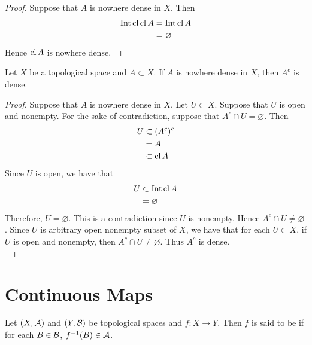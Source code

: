 \documentclass{book}
\begin{document}
	\begin{proof}
		Suppose that $A$ is nowhere dense in $X$. Then 
		\begin{align*}
			\operatorname{Int} \operatorname{cl} \operatorname{cl} A
			& = \operatorname{Int} \operatorname{cl} A \\
			& = \varnothing
		\end{align*}
		Hence $\operatorname{cl} A$ is nowhere dense.
	\end{proof}
	

	\begin{ex}  
		Let $X$ be a topological space and $A \subset X$. If $A$ is nowhere dense in $X$, then $A^c$ is dense.
	\end{ex}
	
	\begin{proof}
		Suppose that $A$ is nowhere dense in $X$. Let $U \subset X$. Suppose that $U$ is open and nonempty. For the sake of contradiction, suppose that  $A^c \cap U = \varnothing$. Then 
		\begin{align*}
			U 
			& \subset (A^c)^c \\
			& = A \\
			& \subset \operatorname{cl} A
		\end{align*}
		Since $U$ is open, we have that  
		\begin{align*}
			U 
			& \subset \operatorname{Int} \operatorname{cl} A \\
			& = \varnothing 
		\end{align*}
		Therefore, $U = \varnothing$. This is a contradiction since $U$ is nonempty. Hence $A^c \cap U \neq \varnothing$. Since $U$ is arbitrary open nonempty subset of $X$, we have that for each $U \subset X$, if $U$ is open and nonempty, then $A^c \cap U \neq \varnothing$. Thus $A^c$ is dense.  \\
	\end{proof}
	
	
	
	
	
	
	
	
	
	
	
	
	
	
	
	
	
	
	
	
	
	
	
	\newpage
	\section{Continuous Maps}	
	
	\begin{defn} 
	Let $(X,\mathcal{A})$ and $(Y,\mathcal{B})$ be topological spaces and $f:X \rightarrow Y$. Then $f$ is said to be  if for each $B \in \mathcal{B}$, $f^{-1}(B) \in \mathcal{A}$.
	\end{defn}
	
\end{document}
